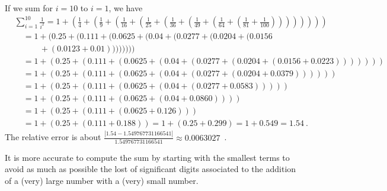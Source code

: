 {If we sum for $i=10$ to $i=1$, we have
\begin{align*}
&\sum_{i=1}^{10} \frac{1}{i^2}
= 1 + \left(\frac{1}{4} + \left(\frac{1}{9} + \left(\frac{1}{16} +
\left(\frac{1}{25} + \left(\frac{1}{36} +
\left(\frac{1}{49} + \left(\frac{1}{64} +
\left(\frac{1}{81} + \frac{1}{100} \right) \right) \right) 
\right) \right) \right) \right) \right) \\
&\quad = 1 + (0.25 + (0.111 + (0.0625 + (0.04 + (0.0277 + (0.0204 + ( 0.0156 \\
&\quad\qquad +( 0.0123 + 0.01 )))))))) \\
&\quad = 1 + (0.25 + (0.111 + (0.0625 + (0.04 + (0.0277 + (0.0204 + ( 0.0156
+ 0.0223 ))))))) \\
&\quad = 1 + (0.25 + (0.111 + (0.0625 + (0.04 + (0.0277 + (0.0204 + 0.0379
)))))) \\
&\quad = 1 + (0.25 + (0.111 + (0.0625 + (0.04 + (0.0277 + 0.0583 ))))) \\
&\quad = 1 + (0.25 + (0.111 + (0.0625 + (0.04 + 0.0860 )))) \\
&\quad = 1 + (0.25 + (0.111 + (0.0625 + 0.126))) \\
&\quad = 1 + (0.25 + (0.111 + 0.188))
= 1 + (0.25 + 0.299)
= 1 + 0.549 = 1.54 \ .
\end{align*}
The relative error is about
$\displaystyle \frac{|1.54-1.549767731166541|}{1.549767731166541}
\approx 0.0063027$\ .

It is more accurate to compute the sum by starting with the smallest
terms to avoid as much as possible the lost of significant digits
associated to the addition of a (very) large number with a (very)
small number.
}


